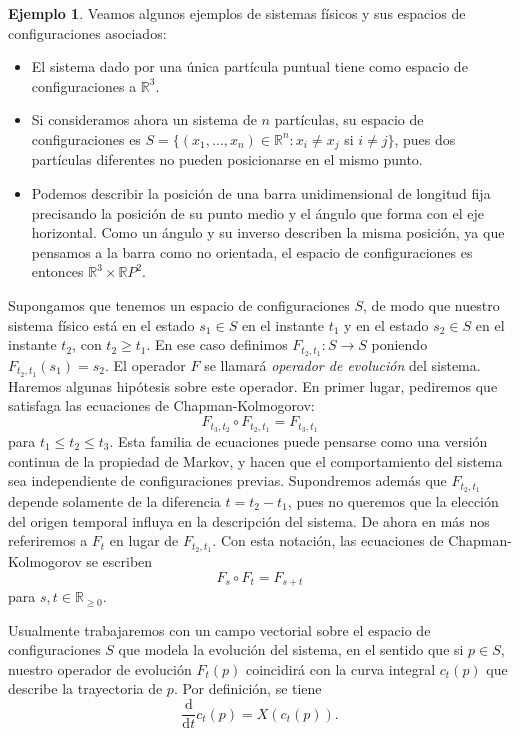 \documentclass[11pt, a4paper]{article}
\newcommand{\RR}{\mathbb{R}}
\newcommand{\dd}{\mathrm{d}}
\newcommand{\ddt}{\frac{\dd}{\dd t}}
\theoremstyle{plain}
\theoremstyle{definition}
\newtheorem{exmp}[prop]{Ejemplo}
\begin{document}
\begin{exmp} Veamos algunos ejemplos de sistemas físicos y sus espacios de configuraciones asociados:
\begin{itemize}
\item El sistema dado por una única partícula puntual tiene como espacio de configuraciones a $\RR^3$.
\item Si consideramos ahora un sistema de $n$ partículas, su espacio de configuraciones es $S=\{(x_1,\dots, x_n)\in\RR^n : x_i\neq x_j$ si $i\neq j\}$, pues dos partículas diferentes no pueden posicionarse en el mismo punto.
\item Podemos describir la posición de una barra unidimensional de longitud fija precisando la posición de su punto medio y el ángulo que forma con el eje horizontal. Como un ángulo y su inverso describen la misma posición, ya que pensamos a la barra como no orientada, el espacio de configuraciones es entonces $\RR^3\times \RR P^2$.
\end{itemize}
\end{exmp}
Supongamos que tenemos un espacio de configuraciones $S$, de modo que nuestro sistema físico está en el estado $s_1\in S$ en el instante $t_1$ y en el estado $s_2\in S$ en el instante $t_2$, con $t_2\geq t_1$. En ese caso definimos $F_{t_2,t_1}:S\to S$ poniendo $F_{t_2,t_1}(s_1)=s_2$. El operador $F$ se llamará \emph{operador de evolución} del sistema. Haremos algunas hipótesis sobre este operador. En primer lugar, pediremos que satisfaga las ecuaciones de Chapman-Kolmogorov:
\[F_{t_3,t_2}\circ F_{t_2,t_1} = F_{t_3,t_1}\]
para $t_1\leq t_2 \leq t_3$. Esta familia de ecuaciones puede pensarse como una versión continua de la propiedad de Markov, y hacen que el comportamiento del sistema sea independiente de configuraciones previas. Supondremos además que $F_{t_2,t_1}$ depende solamente de la diferencia $t=t_2-t_1$, pues no queremos que la elección del origen temporal influya en la descripción del sistema. De ahora en más nos referiremos a $F_t$ en lugar de $F_{t_2,t_1}$. Con esta notación, las ecuaciones de Chapman-Kolmogorov se escriben
\[F_s\circ F_t = F_{s+t}\]
para $s,t\in \RR_{\geq 0}$.

Usualmente trabajaremos con un campo vectorial sobre el espacio de configuraciones $S$ que modela la evolución del sistema, en el sentido que si $p\in S$, nuestro operador de evolución $F_t(p)$ coincidirá con la curva integral $c_t(p)$ que describe la trayectoria de $p$. Por definición, se tiene
\[\ddt c_t(p) = X(c_t(p)).\]
\end{document}
